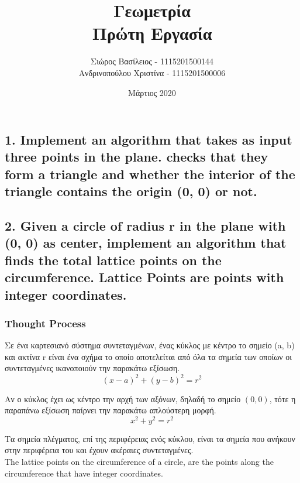 \documentclass[12pt]{article}
\title{\hugeΥπολογιστική Γεωμετρία\\Πρώτη Εργασία}
\author{Σιώρος Βασίλειος - 1115201500144\\Ανδρινοπούλου Χριστίνα - 1115201500006}
\date{Μάρτιος 2020}
\begin{document}
\maketitle


\pagebreak


\subsection*{1. Implement an algorithm that takes as input three points in the plane. checks
    that they form a triangle and whether the interior of the triangle contains the origin (0, 0) or
    not.}

\vspace{2in}

\pagebreak

\subsection*{2. Given a circle of radius r in the plane with (0, 0) as center, implement an
    algorithm that finds the total lattice points on the circumference. Lattice Points are points
    with integer coordinates.}

\vspace{2in}

\subsubsection*{Thought Process}

Σε ένα καρτεσιανό σύστημα συντεταγμένων, ένας κύκλος με κέντρο το σημείο (a, b)
και ακτίνα r είναι ένα σχήμα το οποίο αποτελείται από όλα τα σημεία των οποίων
οι συντεταγμένες ικανοποιούν την παρακάτω εξίσωση. \\

\[ (x - a) ^ 2 + (y - b) ^ 2 = r ^ 2 \]

Αν ο κύκλος έχει ως κέντρο την αρχή των αξόνων, δηλαδή το σημείο \( (0, 0) \), τότε
η παραπάνω εξίσωση παίρνει την παρακάτω απλούστερη μορφή. \\

\[ x ^ 2 + y ^ 2 = r ^ 2 \]

Τα σημεία πλέγματος, επί της περιφέρειας ενός κύκλου, είναι τα σημεία που ανήκουν
στην περιφέρεια του και έχουν ακέραιες συντεταγμένες. \\

The lattice points on the circumference of a circle, are the points along the circumference that have integer coordinates.
\end{document}
